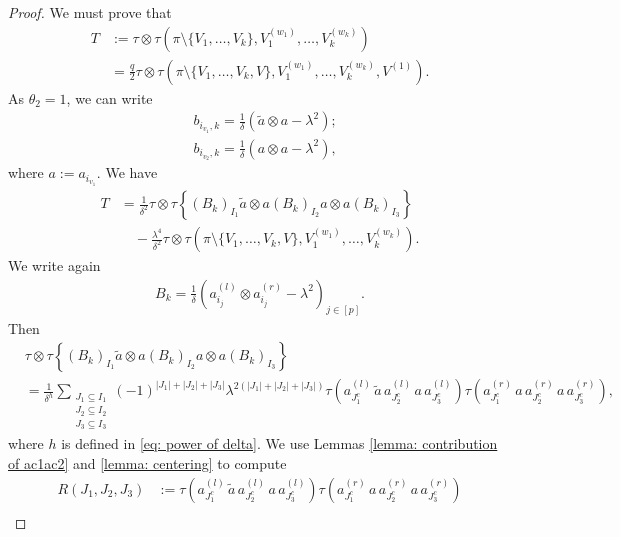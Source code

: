 \documentclass[12pt,reqno]{amsart}
\theoremstyle{plain}
\newcommand{\1}{\mathbf{1}}
\begin{document}
\begin{proof}
    We must prove that
    \begin{align*}
        T&:=\tau\otimes\tau \left(\pi\setminus \{V_1,\ldots,V_{k}\},V_1^{(w_1)},\ldots,V_{k}^{(w_{k})}\right)\\
        &=\frac{q}{2}\tau\otimes\tau \left(\pi\setminus \{V_1,\ldots,V_{k},V\},V_1^{(w_1)},\ldots,V_{k}^{(w_{k})},V^{(1)}\right).
    \end{align*}
     As $\theta_2=1$, we can write
    \begin{align*}
        &b_{i_{v_1},k}=\frac{1}{\delta}\left(\tilde{a}\otimes a-\lambda^2\right);\\
        &b_{i_{v_2},k}=\frac{1}{\delta}\left(a\otimes a-\lambda^2\right),
    \end{align*}
    where $a:=a_{i_{v_1}}$. We have
    \begin{align}\label{eq: T case theta_2=1}
        T&=\frac{1}{\delta^2}\tau\otimes \tau\left\{\left(B_k\right)_{I_1}\tilde{a}\otimes a\left(B_k\right)_{I_2}a\otimes a\left(B_k\right)_{I_3}\right\}\nonumber \\
    &\quad -\frac{\lambda^4}{\delta^2}\tau\otimes \tau\left(\pi\setminus\{V_1,\ldots,V_k,V\},V_1^{(w_1)},\ldots,V_k^{(w_k)}\right).
    \end{align}
    We write again
    \begin{align*}
        B_k=\frac{1}{\delta}\left(a_{i_j}^{(l)}\otimes a_{i_j}^{(r)}-\lambda^2\right)_{j \in [p]}.
    \end{align*}
    Then
    \begin{align*}
        &\tau\otimes \tau\left\{\left(B_k\right)_{I_1}\tilde{a}\otimes a\left(B_k\right)_{I_2}a\otimes a\left(B_k\right)_{I_3}\right\}\\
        &=\frac{1}{\delta^h}\sum_{\substack{J_1 \subseteq I_1\\ J_2 \subseteq I_2\\ J_3 \subseteq I_3}}(-1)^{|J_1|+|J_2|+|J_3|}\lambda^{2(|J_1|+|J_2|+|J_3|)}\tau\left(a_{J_1^c}^{(l)}\, \tilde{a} \, a_{J_2^c}^{(l)}\, a \, a_{J_3^c}^{(l)}\right)\tau\left(a_{J_1^c}^{(r)}\, a \, a_{J_2^c}^{(r)}\, a\, a_{J_3^c}^{(r)}\right),
    \end{align*}
    where $h$ is defined in \eqref{eq: power of delta}. We use Lemmas \ref{lemma: contribution of ac1ac2} and \ref{lemma: centering} to compute
    \begin{align*}
        R(J_1,J_2,J_3)&:=\tau\left(a_{J_1^c}^{(l)}\, \tilde{a} \, a_{J_2^c}^{(l)}\, a \, a_{J_3^c}^{(l)}\right)\tau\left(a_{J_1^c}^{(r)}\, a \, a_{J_2^c}^{(r)}\, a\, a_{J_3^c}^{(r)}\right)\\

\end{align*}
\end{proof}
\end{document}

